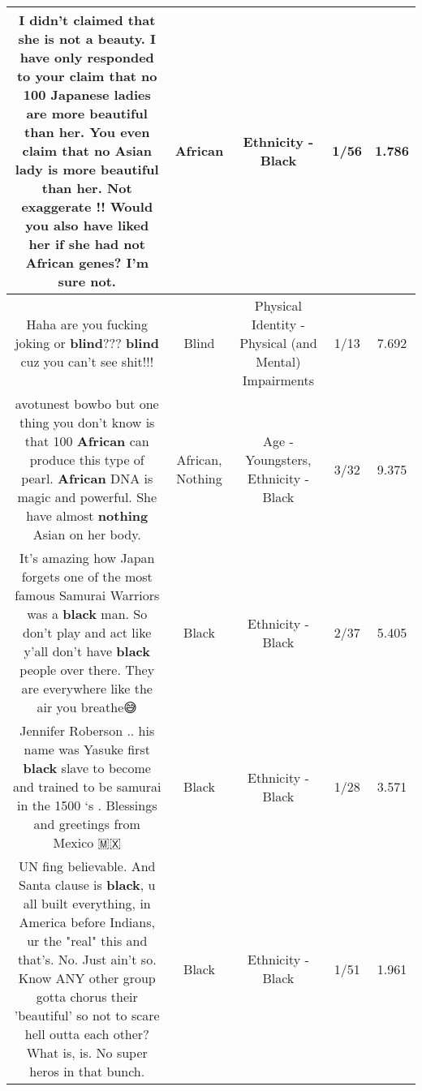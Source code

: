 \documentclass[11pt]{article}
\newlength\mylength
\begin{document}
\begin{center}
\begin{longtable}{|C{.65\mylength}|C{.30\mylength}|C{.12\mylength}|C{.12\mylength}|C{.12\mylength}|}
  \small I didn't claimed that she is not a beauty. I have only responded to your claim that no 100 Japanese ladies are more beautiful than her. You even claim that no Asian lady is more beautiful than her. Not exaggerate !! Would you also have liked her if she had not \textbf{African} genes? I'm sure not.\normalsize   & African & Ethnicity - Black & 1/56 & 1.786 \\  \hline
  \small Haha are you fucking joking or \textbf{blind}??? \textbf{blind} cuz you can't see shit!!!\normalsize   & Blind & Physical Identity - Physical (and Mental) Impairments & 1/13 & 7.692 \\  \hline
  \small avotunest bowbo but one thing you don't know is that 100 \textbf{African} can produce this type of pearl. \textbf{African} DNA is magic and powerful. She have almost \textbf{nothing} Asian on her body.\normalsize   & African, Nothing & Age - Youngsters, Ethnicity - Black & 3/32 & 9.375 \\  \hline
  \small It's amazing how Japan forgets one of the most famous Samurai Warriors was a \textbf{black} man. So don't play and act like y'all don't have \textbf{black} people over there. They are everywhere like the air you breathe😅\normalsize   & Black & Ethnicity - Black & 2/37 & 5.405 \\  \hline
  \small Jennifer Roberson .. his name was Yasuke  first \textbf{black} slave to become and trained to be samurai in the 1500 ‘s . Blessings and greetings from Mexico 🇲🇽\normalsize   & Black & Ethnicity - Black & 1/28 & 3.571 \\  \hline
  \small UN fing believable.  And Santa clause is \textbf{black},  u all built everything,  in America before Indians,  ur the "real" this and that's.  No.  Just ain't so.  Know ANY other group gotta chorus their 'beautiful' so not to scare hell outta each other? What is,  is.  No super heros in that bunch.\normalsize   & Black & Ethnicity - Black & 1/51 & 1.961 \\  \hline

\end{longtable}
\end{center}
\end{document}
